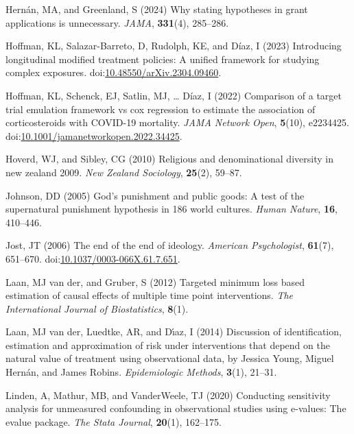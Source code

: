 \documentclass[
  single column]{article}
\newlength{\cslhangindent}
\newenvironment{CSLReferences}[2] %
 {\begin{list}{}{%
  \setlength{\itemindent}{0pt}
  \setlength{\leftmargin}{0pt}
  \setlength{\parsep}{0pt}
  \ifodd #1
   \setlength{\leftmargin}{\cslhangindent}
   \setlength{\itemindent}{-1\cslhangindent}
  \fi
  \setlength{\itemsep}{#2\baselineskip}}}
 {\end{list}}
\begin{document}
\begin{CSLReferences}{1}{0}
Hernán, MA, and Greenland, S (2024) Why stating hypotheses in grant
applications is unnecessary. \emph{JAMA}, \textbf{331}(4), 285--286.

Hoffman, KL, Salazar-Barreto, D, Rudolph, KE, and Díaz, I (2023)
Introducing longitudinal modified treatment policies: A unified
framework for studying complex exposures.
doi:\href{https://doi.org/10.48550/arXiv.2304.09460}{10.48550/arXiv.2304.09460}.

Hoffman, KL, Schenck, EJ, Satlin, MJ, \ldots{} Díaz, I (2022) Comparison
of a target trial emulation framework vs cox regression to estimate the
association of corticosteroids with COVID-19 mortality. \emph{JAMA
Network Open}, \textbf{5}(10), e2234425.
doi:\href{https://doi.org/10.1001/jamanetworkopen.2022.34425}{10.1001/jamanetworkopen.2022.34425}.

Hoverd, WJ, and Sibley, CG (2010) Religious and denominational diversity
in new zealand 2009. \emph{New Zealand Sociology}, \textbf{25}(2),
59--87.

Johnson, DD (2005) God{'}s punishment and public goods: A test of the
supernatural punishment hypothesis in 186 world cultures. \emph{Human
Nature}, \textbf{16}, 410--446.

Jost, JT (2006) The end of the end of ideology. \emph{American
Psychologist}, \textbf{61}(7), 651--670.
doi:\href{https://doi.org/10.1037/0003-066X.61.7.651}{10.1037/0003-066X.61.7.651}.

Laan, MJ van der, and Gruber, S (2012) Targeted minimum loss based
estimation of causal effects of multiple time point interventions.
\emph{The International Journal of Biostatistics}, \textbf{8}(1).

Laan, MJ van der, Luedtke, AR, and Dı́az, I (2014) Discussion of
identification, estimation and approximation of risk under interventions
that depend on the natural value of treatment using observational data,
by {J}essica {Y}oung, {M}iguel {H}ern{á}n, and {J}ames {R}obins.
\emph{Epidemiologic Methods}, \textbf{3}(1), 21--31.

Linden, A, Mathur, MB, and VanderWeele, TJ (2020) Conducting sensitivity
analysis for unmeasured confounding in observational studies using
e-values: The evalue package. \emph{The Stata Journal}, \textbf{20}(1),
162--175.


\end{CSLReferences}
\end{document}
